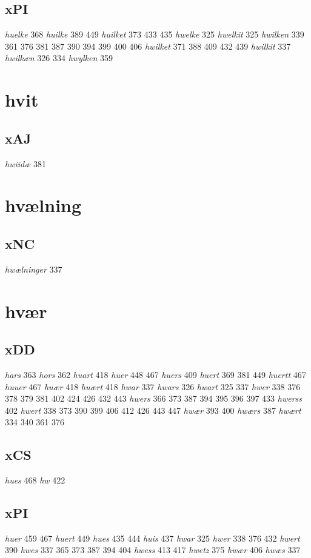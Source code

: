 \documentclass[a4paper,twocolumn]{article}
\begin{document}
\subsection{xPI}
\label{sec:org70bfbe6}
\emph{huelke} 368 \emph{huilke} 389 449 \emph{huilket} 373 433 435 \emph{hwelke} 325 \emph{hwelkit} 325 \emph{hwilken} 339 361 376 381 387 390 394 399 400 406 \emph{hwilket} 371 388 409 432 439 \emph{hwilkit} 337 \emph{hwilkæn} 326 334 \emph{hwylken} 359 
\section{hvit}
\label{sec:orga97636a}
\subsection{xAJ}
\label{sec:org5c3788e}
\emph{hwiidæ} 381 
\section{hvælning}
\label{sec:org50cb969}
\subsection{xNC}
\label{sec:org7ed60b3}
\emph{hwælninger} 337 
\section{hvær}
\label{sec:org5f8b80e}
\subsection{xDD}
\label{sec:org71f7b57}
\emph{hars} 363 \emph{hors} 362 \emph{huart} 418 \emph{huer} 448 467 \emph{huers} 409 \emph{huert} 369 381 449 \emph{huertt} 467 \emph{huuer} 467 \emph{huær} 418 \emph{huært} 418 \emph{hwar} 337 \emph{hwars} 326 \emph{hwart} 325 337 \emph{hwer} 338 376 378 379 381 402 424 426 432 443 \emph{hwers} 366 373 387 394 395 396 397 433 \emph{hwerss} 402 \emph{hwert} 338 373 390 399 406 412 426 443 447 \emph{hwær} 393 400 \emph{hwærs} 387 \emph{hwært} 334 340 361 376 
\subsection{xCS}
\label{sec:org1adef12}
\emph{hues} 468 \emph{hw} 422 
\subsection{xPI}
\label{sec:org747ef6e}
\emph{huer} 459 467 \emph{huert} 449 \emph{hues} 435 444 \emph{huis} 437 \emph{hwar} 325 \emph{hwer} 338 376 432 \emph{hwert} 390 \emph{hwes} 337 365 373 387 394 404 \emph{hwess} 413 417 \emph{hwetz} 375 \emph{hwær} 406 \emph{hwæs} 337 
\end{document}
